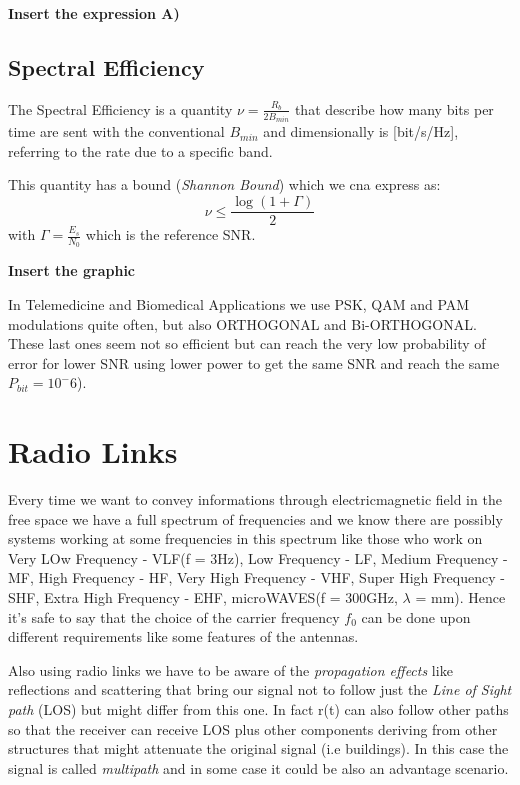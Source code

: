 \textbf{Insert the expression A)}

\subsection{Spectral Efficiency}
The Spectral Efficiency is a quantity $\nu = \frac{R_b}{2B_{min}}$ that describe how many bits per time are sent with the conventional $B_{min}$ and dimensionally is [bit/s/Hz], referring to the rate due to a specific band.

This quantity has a bound (\textit{Shannon Bound}) which we cna express as:
\begin{equation}
\nu \leq \frac{\log (1 + \Gamma)}{2} 
\end{equation}
with $\Gamma = \frac{E_s}{N_0}$ which is the reference SNR.

\textbf{Insert the graphic}

In Telemedicine and Biomedical Applications we use PSK, QAM and PAM modulations quite often, but also ORTHOGONAL and Bi-ORTHOGONAL. These last ones seem not so efficient but can reach the very low probability of error for lower SNR using lower power to get the same SNR and reach the same $P_{bit} = 10^-6$).

\section{Radio Links}
Every time we want to convey informations through electricmagnetic field in the free space we have a full spectrum of frequencies and we know there are possibly systems working at some frequencies in this spectrum like those who work on Very LOw Frequency - VLF(f = 3Hz), Low Frequency - LF, Medium Frequency - MF, High Frequency - HF, Very High Frequency - VHF, Super High Frequency - SHF, Extra High Frequency - EHF, microWAVES(f = 300GHz, $\lambda$ = mm).
Hence it's safe to say that the choice of the carrier frequency $f_0$ can be done upon different requirements like some features of the antennas. 

Also using radio links we have to be aware of the \textit{propagation effects} like reflections and scattering that bring our signal not to follow just the \textit{Line of Sight path} (LOS) but might differ from this one. In fact r(t) can also follow other paths so that the receiver can receive LOS plus other components deriving from other structures that might attenuate the original signal (i.e buildings). In this case the signal is called \textit{multipath} and in some case it could be also an advantage scenario.

